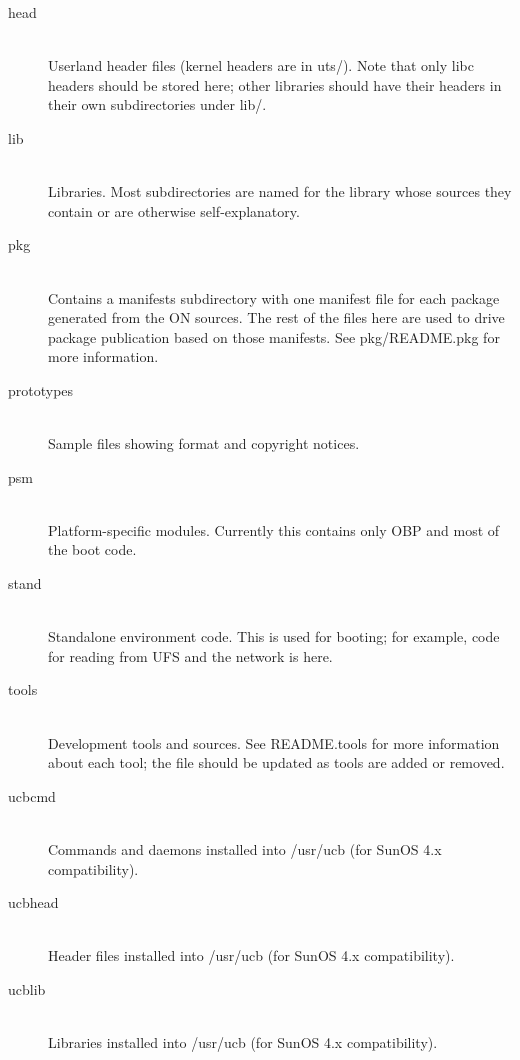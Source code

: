 \documentclass{article}
\begin{document}
\begin{description}
\item[head] \hfill \\
  Userland header files (kernel headers are in uts/). Note that only libc
  headers should be stored here; other libraries should have their headers in
  their own subdirectories under lib/.

\item[lib] \hfill \\
  Libraries. Most subdirectories are named for the library whose sources they
  contain or are otherwise self-explanatory.

\item[pkg] \hfill \\
  Contains a manifests subdirectory with one manifest file for each package
  generated from the ON sources. The rest of the files here are used to drive
  package publication based on those manifests.  See pkg/README.pkg for more
  information.

\item[prototypes] \hfill \\
  Sample files showing format and copyright notices.

\item[psm] \hfill \\
  Platform-specific modules. Currently this contains only OBP and most of the
  boot code.

\item[stand] \hfill \\
  Standalone environment code. This is used for booting; for example, code for
  reading from UFS and the network is here.

\item[tools] \hfill \\
  Development tools and sources. See README.tools for more information about
  each tool; the file should be updated as tools are added or removed.

\item[ucbcmd] \hfill \\
  Commands and daemons installed into /usr/ucb (for SunOS 4.x compatibility).

\item[ucbhead] \hfill \\
  Header files installed into /usr/ucb (for SunOS 4.x compatibility).

\item[ucblib] \hfill \\
  Libraries installed into /usr/ucb (for SunOS 4.x compatibility).


\end{description}
\end{document}
